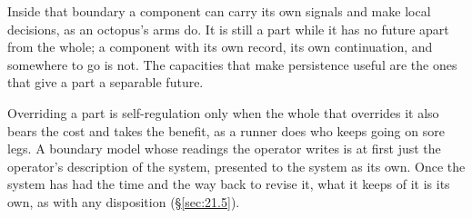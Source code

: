 Inside that boundary a component can carry its own signals and make local decisions, as an octopus's arms do.
It is still a part while it has no future apart from the whole; a component with its own record, its own continuation, and somewhere to go is not.
The capacities that make persistence useful are the ones that give a part a separable future.

Overriding a part is self-regulation only when the whole that overrides it also bears the cost and takes the benefit, as a runner does who keeps going on sore legs.
A boundary model whose readings the operator writes is at first just the operator's description of the system, presented to the system as its own. Once the system has had the time and the way back to revise it, what it keeps of it is its own, as with any disposition (\S\ref{sec:21.5}).
